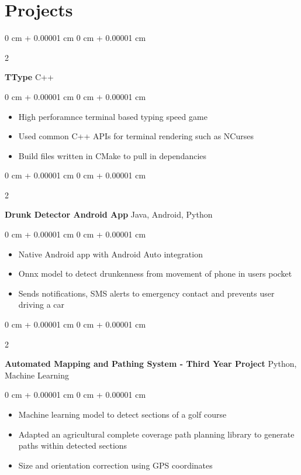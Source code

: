 \documentclass[10pt, letterpaper]{article}
\newenvironment{highlights}{
    \begin{itemize}[
        topsep=0.10 cm,
        parsep=0.10 cm,
        partopsep=0pt,
        itemsep=0pt,
        leftmargin=0 cm + 10pt
    ]
}{
    \end{itemize}
} %
\newenvironment{onecolentry}{
    \begin{adjustwidth}{
        0 cm + 0.00001 cm
    }{
        0 cm + 0.00001 cm
    }
}{
    \end{adjustwidth}
} %
\newenvironment{twocolentry}[2][]{
    \onecolentry
    \def\secondColumn{#2}
    \setcolumnwidth{\fill, 4.5 cm}
    \begin{paracol}{2}
}{
    \switchcolumn \raggedleft \secondColumn
    \end{paracol}
    \endonecolentry
} %
\begin{document}
    \section{Projects}

    \begin{twocolentry}{
        C++
    }
        \textbf{TType}\end{twocolentry}
    \vspace{0.10 cm}
    \begin{onecolentry}
        \begin{highlights}
            \item High perforamnce terminal based typing speed game
            \item Used common C++ APIs for terminal rendering such as NCurses
            \item Build files written in CMake to pull in dependancies
        \end{highlights}
    \end{onecolentry}
    \vspace{0.2 cm}

    \begin{twocolentry}{
        Java, Android, Python
    }
        \textbf{Drunk Detector Android App}\end{twocolentry}
    \vspace{0.10 cm}
    \begin{onecolentry}
        \begin{highlights}
            \item Native Android app with Android Auto integration
            \item Onnx model to detect drunkenness from movement of phone in users pocket
            \item Sends notifications, SMS alerts to emergency contact and prevents user driving a car
        \end{highlights}
    \end{onecolentry}


    \vspace{0.2 cm}

    \begin{twocolentry}{
        Python, Machine Learning
    }

    \textbf{Automated Mapping and Pathing System - Third Year Project}\end{twocolentry}
    \vspace{0.10 cm}
    \begin{onecolentry}
        \begin{highlights}
            \item Machine learning model to detect sections of a golf course
            \item Adapted an agricultural complete coverage path planning library to generate paths within detected sections
            \item Size and orientation correction using GPS coordinates
        \end{highlights}
    \end{onecolentry}
\end{document}
